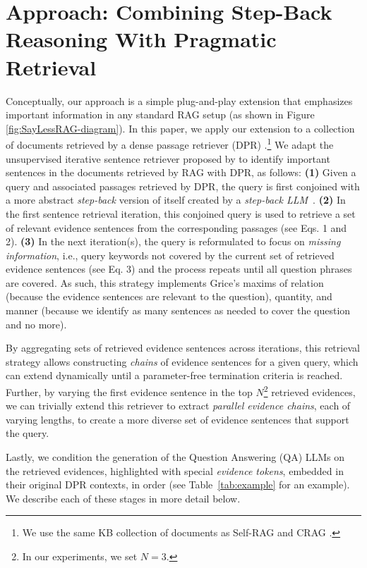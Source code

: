 \section{Approach: Combining Step-Back Reasoning With Pragmatic Retrieval}
\label{sec:approach}
Conceptually, our approach is a simple plug-and-play extension that emphasizes important information in any standard RAG setup (as shown in Figure \ref{fig:SayLessRAG-diagram}).
In this paper, we apply our extension to a collection of documents  retrieved by a dense passage retriever (DPR) \cite{izacard2021contriever}.\footnote{We use the same KB collection of documents as Self-RAG \cite{asai2024selfrag} and CRAG \cite{yan2024corrective}.} 
We adapt the unsupervised iterative sentence retriever proposed by  to identify important sentences in the documents retrieved by RAG with DPR, as follows:
\textbf{(1)} Given a query and associated passages retrieved by DPR, the query is first conjoined with a more abstract \textit{step-back} version of itself created by a \textit{step-back LLM}~\cite{zheng2024stepbackevokingreasoning}. \textbf{(2)} In the first sentence retrieval iteration, this conjoined query is used to retrieve a set of relevant evidence sentences from the corresponding passages (see Eqs. 1 and 2). \textbf{(3)} In the next iteration(s), the query is reformulated to focus on \textit{missing information}, i.e., query keywords not covered by the current set of retrieved evidence sentences (see Eq. 3) and the process repeats until all question phrases are covered. As such, this strategy implements Grice's maxims of relation (because the evidence sentences are relevant to the question), quantity, and manner (because we identify as many sentences as needed to cover the question and no more).

By aggregating sets of retrieved evidence sentences across iterations, this retrieval strategy allows constructing \textit{chains} of evidence sentences for a given query, which can extend dynamically until a parameter-free termination criteria is reached. Further, by varying the first evidence sentence in the top $N$\footnote{In our experiments, we set $N=3$.} retrieved evidences, we can trivially extend this retriever to extract \textit{parallel evidence chains}, each of varying lengths, to create a more diverse set of evidence sentences that support the query. 

Lastly, we condition the generation of the Question Answering (QA) LLMs on the retrieved evidences, highlighted with special \textit{evidence tokens}, embedded in their original DPR contexts, in order (see Table~\ref{tab:example} for an example). 
We describe each of these stages in more detail below.

